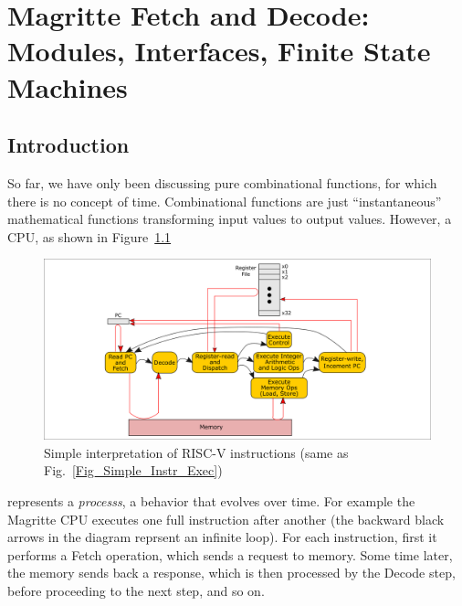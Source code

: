 

\chapter{Magritte Fetch and Decode: Modules, Interfaces, Finite State Machines}


\setcounter{page}{1}
\renewcommand{\thepage}{\arabic{chapter}-\arabic{page}}

\label{ch_Magritte_Fetch_Decode}



\section{Introduction}

So far, we have only been discussing pure combinational functions, for
which there is no concept of time.  Combinational functions are just
``instantaneous'' mathematical functions transforming input values to
output values.  However, a CPU, as shown in
Figure~\ref{Fig_Magritte_Fetch_Decode_Simple_Instr_Exec}
\begin{figure}[htbp]
  \centerline{\includegraphics[width=6in,angle=0]{ch030_RISCV_Design_Space/Figures/Fig_Simple_Instr_Exec}}
  \caption{\label{Fig_Magritte_Fetch_Decode_Simple_Instr_Exec}Simple interpretation of RISC-V instructions (same as Fig.~\ref{Fig_Simple_Instr_Exec})}
\end{figure}
represents a \emph{processs}, a behavior that evolves over time.  For
example the Magritte CPU executes one full instruction after another
(the backward black arrows in the diagram reprsent an infinite loop).
For each instruction, first it performs a Fetch operation, which sends
a request to memory. Some time later, the memory sends back a
response, which is then processed by the Decode step, before
proceeding to the next step, and so on.

